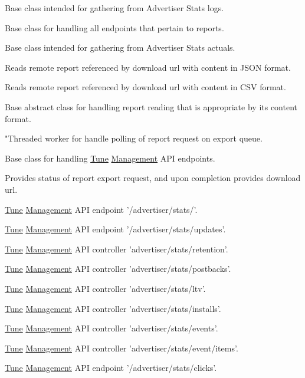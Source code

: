 Base class intended for gathering from Advertiser Stats logs.

Base class for handling all endpoints that pertain to reports.

Base class intended for gathering from Advertiser Stats actuals.

Reads remote report referenced by download url with content in J\-S\-O\-N format.

Reads remote report referenced by download url with content in C\-S\-V format.

Base abstract class for handling report reading that is appropriate by its content format.

"Threaded worker for handle polling of report request on export queue.

Base class for handling \hyperlink{namespaceTune}{Tune} \hyperlink{namespaceTune_1_1Management}{Management} A\-P\-I endpoints.

Provides status of report export request, and upon completion provides download url.

\hyperlink{namespaceTune}{Tune} \hyperlink{namespaceTune_1_1Management}{Management} A\-P\-I endpoint '/advertiser/stats/'.

\hyperlink{namespaceTune}{Tune} \hyperlink{namespaceTune_1_1Management}{Management} A\-P\-I endpoint '/advertiser/stats/updates'.

\hyperlink{namespaceTune}{Tune} \hyperlink{namespaceTune_1_1Management}{Management} A\-P\-I controller 'advertiser/stats/retention'.

\hyperlink{namespaceTune}{Tune} \hyperlink{namespaceTune_1_1Management}{Management} A\-P\-I controller 'advertiser/stats/postbacks'.

\hyperlink{namespaceTune}{Tune} \hyperlink{namespaceTune_1_1Management}{Management} A\-P\-I controller 'advertiser/stats/ltv'.

\hyperlink{namespaceTune}{Tune} \hyperlink{namespaceTune_1_1Management}{Management} A\-P\-I controller 'advertiser/stats/installs'.

\hyperlink{namespaceTune}{Tune} \hyperlink{namespaceTune_1_1Management}{Management} A\-P\-I controller 'advertiser/stats/events'.

\hyperlink{namespaceTune}{Tune} \hyperlink{namespaceTune_1_1Management}{Management} A\-P\-I controller 'advertiser/stats/event/items'.

\hyperlink{namespaceTune}{Tune} \hyperlink{namespaceTune_1_1Management}{Management} A\-P\-I endpoint '/advertiser/stats/clicks'.

